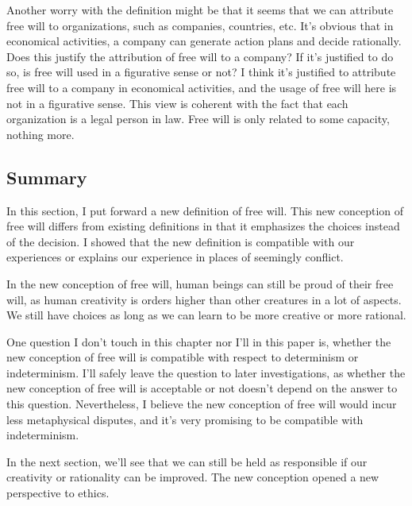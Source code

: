 Another worry with the definition might be that it seems that we can attribute free will to organizations, such as companies, countries, etc. It’s obvious that in economical activities, a company can generate action plans and decide rationally. Does this justify the attribution of free will to a company? If it’s justified to do so, is free will used in a figurative sense or not? I think it’s justified to attribute free will to a company in economical activities, and the usage of free will here is not in a figurative sense. This view is coherent with the fact that each organization is a legal person in law. Free will is only related to some capacity, nothing more.

\subsection{Summary}

In this section, I put forward a new definition of free will. This new conception of free will differs from existing definitions in that it emphasizes the choices instead of the decision. I showed that the new definition is compatible with our experiences or explains our experience in places of seemingly conflict.

In the new conception of free will, human beings can still be proud of their free will, as human creativity is orders higher than other creatures in a lot of aspects. We still have choices as long as we can learn to be more creative or more rational.

One question I don't touch in this chapter nor I'll in this paper is, whether the new conception of free will is compatible with respect to determinism or indeterminism. I'll safely leave the question to later investigations, as whether the new conception of free will is acceptable or not doesn't depend on the answer to this question. Nevertheless, I believe the new conception of free will would incur less metaphysical disputes, and it's very promising to be compatible with indeterminism.

In the next section, we'll see that we can still be held as responsible if our creativity or rationality can be improved. The new conception opened a new perspective to ethics.
